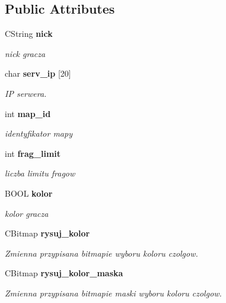 \subsection*{Public Attributes}
\begin{CompactItemize}
\item 
CString {\bf nick}\label{class_c_dolacz_7002e1fb7f7be0cc17ef4c7483479e9d}

\begin{CompactList}\small\item\em nick gracza \item\end{CompactList}\item 
char {\bf serv\_\-ip} [20]\label{class_c_dolacz_9e5eabb48873bc8f66053c1e3d7d4af4}

\begin{CompactList}\small\item\em IP serwera. \item\end{CompactList}\item 
int {\bf map\_\-id}\label{class_c_dolacz_199e0ef23e40ada288811e3ccca04403}

\begin{CompactList}\small\item\em identyfikator mapy \item\end{CompactList}\item 
int {\bf frag\_\-limit}\label{class_c_dolacz_2a4da32ef62ef900e69c4896045cbcc2}

\begin{CompactList}\small\item\em liczba limitu fragow \item\end{CompactList}\item 
BOOL {\bf kolor}\label{class_c_dolacz_9efc99d57bd960e7081e6421d838a11b}

\begin{CompactList}\small\item\em kolor gracza \item\end{CompactList}\item 
CBitmap {\bf rysuj\_\-kolor}\label{class_c_dolacz_36e48aa6831f65ce55b331200c942c39}

\begin{CompactList}\small\item\em Zmienna przypisana bitmapie wyboru koloru czolgow. \item\end{CompactList}\item 
CBitmap {\bf rysuj\_\-kolor\_\-maska}\label{class_c_dolacz_277607e23ca58f056b9114c712bad1ba}

\begin{CompactList}\small\item\em Zmienna przypisana bitmapie maski wyboru koloru czolgow. \item\end{CompactList}\end{CompactItemize}


